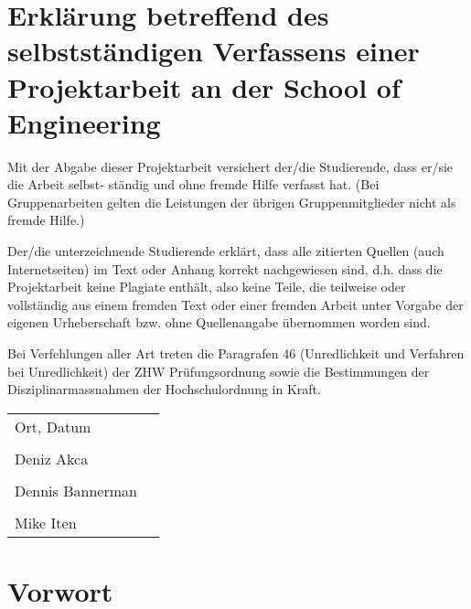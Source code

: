 \documentclass[../main.tex]{subfiles}
\begin{document}
	
	\section*{Erklärung betreffend des selbstständigen Verfassens einer Projektarbeit an der School of Engineering}
	
	Mit der Abgabe dieser Projektarbeit versichert der/die Studierende, dass er/sie die Arbeit selbst-
	ständig und ohne fremde Hilfe verfasst hat. (Bei Gruppenarbeiten gelten die Leistungen der übrigen
	Gruppenmitglieder nicht als fremde Hilfe.)\vspace{5mm}
	
	Der/die unterzeichnende Studierende erklärt, dass alle zitierten Quellen (auch Internetseiten) im Text
	oder Anhang korrekt nachgewiesen sind, d.h. dass die Projektarbeit keine Plagiate enthält, also keine
	Teile, die teilweise oder vollständig aus einem fremden Text oder einer fremden Arbeit unter Vorgabe der
	eigenen Urheberschaft bzw. ohne Quellenangabe übernommen worden sind.\vspace{5mm}
	
	Bei Verfehlungen aller Art treten die Paragrafen 46 (Unredlichkeit und Verfahren bei Unredlichkeit) der
	ZHW Prüfungsordnung sowie die Bestimmungen der Disziplinarmassnahmen der Hochschulordnung in
	Kraft.\vspace{15mm}
	
	\noindent\begin{tabular}{@{}p{2.5in}p{2.5in}@{}}
		Ort, Datum                       & \dotfill\\
		\\
		Deniz Akca                       & \dotfill\\
		\\
		Dennis Bannerman                 & \dotfill\\
		\\
		Mike Iten                        & \dotfill\\
	\end{tabular} 
	
	\newpage
	
	\section{Vorwort}
	
	
\end{document}
